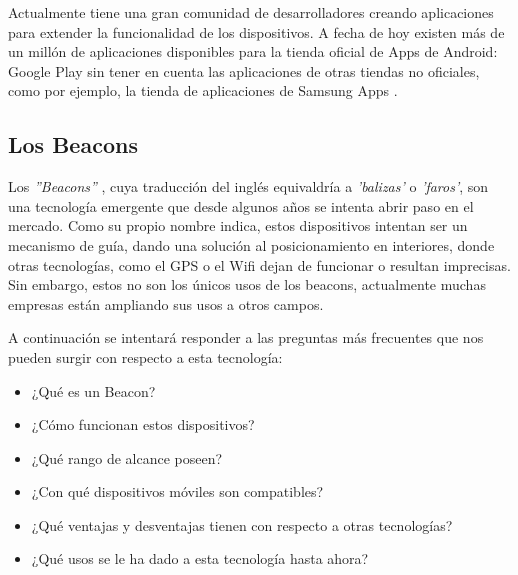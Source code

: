 Actualmente tiene una gran comunidad de desarrolladores creando aplicaciones para extender la funcionalidad de los dispositivos. A fecha de hoy existen más de un millón de aplicaciones disponibles para la tienda oficial de Apps de Android: Google Play \cite{URL::GooglePlay} sin tener en cuenta las aplicaciones de otras tiendas no oficiales, como por ejemplo, la tienda de aplicaciones de Samsung Apps \cite{URL::SamsungApps}.

\subsection{Los Beacons}

Los \textit{''Beacons''} \cite{URL::Beacon}, cuya traducción del inglés equivaldría a \textit{'balizas'} o \textit{'faros'}, son una tecnología emergente que desde algunos años se intenta abrir paso en el mercado. Como su propio nombre indica, estos dispositivos intentan ser un mecanismo de guía, dando una solución al posicionamiento en interiores, donde otras tecnologías, como el GPS o el Wifi dejan de funcionar o resultan imprecisas. Sin embargo, estos no son los únicos usos de los beacons, actualmente muchas empresas están ampliando sus usos a otros campos.


A continuación se intentará responder a las preguntas más frecuentes que nos pueden surgir con respecto a esta tecnología:


\begin{itemize}
\item ¿Qué es un Beacon?
\item ¿Cómo funcionan estos dispositivos?
\item ¿Qué rango de alcance poseen?
\item ¿Con qué dispositivos móviles son compatibles? 
\item ¿Qué ventajas y desventajas tienen con respecto a otras tecnologías?
\item ¿Qué usos se le ha dado a esta tecnología hasta ahora?
\end{itemize}

\begin{figure}[!h]
        \begin{floatrow}
        \end{floatrow}
\end{figure}

